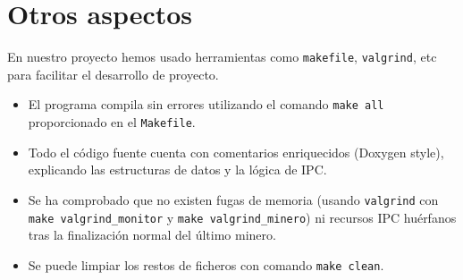 \documentclass[12pt,a4paper]{article}
\begin{document}
\section{Otros aspectos}
En nuestro proyecto hemos usado herramientas como \texttt{makefile}, \texttt{valgrind}, etc para facilitar el desarrollo de proyecto.
\begin{itemize}
    \item El programa compila sin errores utilizando el comando \texttt{make all} proporcionado en el \texttt{Makefile}.
    \item Todo el código fuente cuenta con comentarios enriquecidos (Doxygen style), explicando las estructuras de datos y la lógica de IPC.
    \item Se ha comprobado que no existen fugas de memoria (usando \texttt{valgrind} con \texttt{make valgrind\_monitor} y \texttt{make valgrind\_minero}) ni recursos IPC huérfanos tras la finalización normal del último minero.
    \item Se puede limpiar los restos de ficheros con comando \texttt{make clean}.
\end{itemize}
\end{document}

